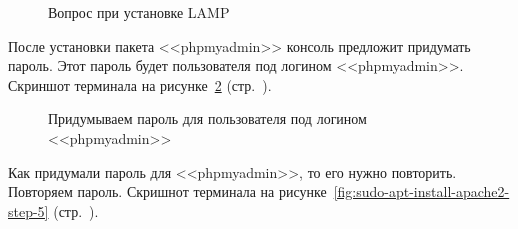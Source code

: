\begin{figure}[p]
    \caption{Вопрос при установке LAMP}
    \label{fig:sudo-apt-install-apache2-step-3}
\end{figure}

После установки пакета <<phpmyadmin>> консоль предложит придумать пароль. Этот пароль будет пользователя под логином <<phpmyadmin>>.
Скриншот терминала на рисунке~\ref{fig:sudo-apt-install-apache2-step-4} (стр.~\pageref{fig:sudo-apt-install-apache2-step-4}).

\begin{figure}[p]
    \caption{Придумываем пароль для пользователя под логином <<phpmyadmin>>}
    \label{fig:sudo-apt-install-apache2-step-4}
\end{figure}

Как придумали пароль для <<phpmyadmin>>, то его нужно повторить. Повторяем пароль.
Скришнот терминала на рисунке~\ref{fig:sudo-apt-install-apache2-step-5} (стр.~\pageref{fig:sudo-apt-install-apache2-step-5}).

